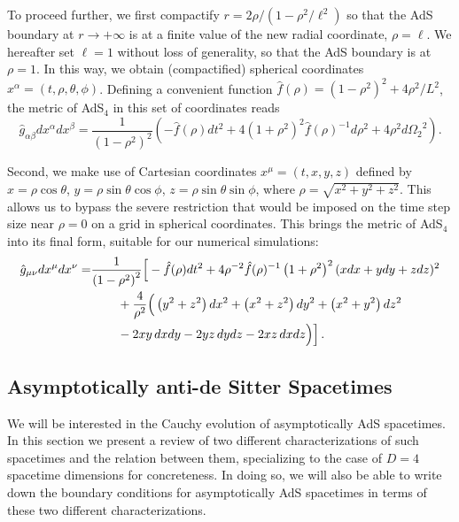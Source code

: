 \documentclass[a4paper,11pt]{article}
\numberwithin{equation}{section}
\begin{document}
To proceed further, we first compactify $r=2\rho/(1-\rho^2/\ell^2)$ so that the AdS boundary at $r \rightarrow +\infty$ is at a finite value of the new radial coordinate, $\rho=\ell$.
We hereafter set $\ell=1$ without loss of generality, so that the AdS boundary is at $\rho=1$. In this way, we obtain (compactified) spherical coordinates $x^\alpha=(t,\rho,\theta,\phi)$.
Defining a convenient function $\hat{f}(\rho) = (1-\rho^2)^2+4\rho^2/L^2$, the metric of AdS$_4$ in this set of coordinates reads 
\begin{equation}\label{eqn:ads4_compact}
\hat{g}_{\alpha\beta}dx^{\alpha}dx^{\beta} = \frac{1}{(1-\rho^2)^2} \left( -\hat{f}(\rho) dt^2 + 4(1+\rho^2)^2 \hat{f}(\rho)^{-1} d\rho^2 + 4\rho^2 d{\Omega_2}^2 \right).
\end{equation}

Second, we make use of Cartesian coordinates $x^\mu=(t,x,y,z)$ defined by $x=\rho\cos\theta$, $y=\rho\sin\theta\cos\phi$, $z=\rho\sin\theta\sin\phi$, where $\rho=\sqrt{x^2+y^2+z^2}$.
This allows us to bypass the severe restriction that would be imposed on the time step size near $\rho=0$ on a grid in spherical coordinates.
This brings the metric of AdS$_4$ into its final form, suitable for our numerical simulations:
\begin{eqnarray}\label{eqn:ads4_final}
\hat{g}_{\mu\nu}dx^{\mu}dx^{\nu}=&\frac{1}{\left(1-\rho^2\right)^2 }\Big[ -\hat{f}(\rho)dt^2 +4\rho^{-2}\hat{f}(\rho)^{-1} \left(1+\rho^2\right)^2 (x dx + y dy + z dz)^2 \nonumber \\
&\hspace{0.75cm}+\frac{4}{\rho^2} \Big(\left(y^2+z^2\right) dx^2 + \left(x^2+z^2\right) dy^2 + \left(x^2+y^2\right) dz^2 \nonumber\\
&\hspace{0.75cm}-2 x y\, dx dy - 2 y z\, dy dz - 2 x z\,dx dz\Big)\Big]\,.
\end{eqnarray}


\subsection{Asymptotically anti-de Sitter Spacetimes}\label{subsec:asyAdS}

We will be interested in the Cauchy evolution of asymptotically AdS spacetimes. 
In this section we present a review of two different characterizations of such spacetimes and the relation between them, specializing to the case of $D=4$ spacetime dimensions for concreteness. 
In doing so, we will also be able to write down the boundary conditions for asymptotically AdS spacetimes in terms of these two different characterizations.
\end{document}
